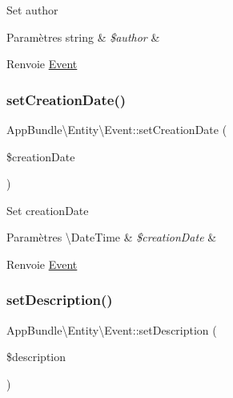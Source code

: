 Set author


\begin{DoxyParams}[1]{Paramètres}
string & {\em \$author} & \\
\hline
\end{DoxyParams}
\begin{DoxyReturn}{Renvoie}
\hyperlink{classAppBundle_1_1Entity_1_1Event}{Event} 
\end{DoxyReturn}
\mbox{\label{classAppBundle_1_1Entity_1_1Event_a20b1f3bfc2c142e2b807384631101d06}} 
\subsubsection{\texorpdfstring{set\+Creation\+Date()}{setCreationDate()}}
{\footnotesize\ttfamily App\+Bundle\textbackslash{}\+Entity\textbackslash{}\+Event\+::set\+Creation\+Date (\begin{DoxyParamCaption}\item[{}]{\$creation\+Date }\end{DoxyParamCaption})}

Set creation\+Date


\begin{DoxyParams}[1]{Paramètres}
\textbackslash{}\+Date\+Time & {\em \$creation\+Date} & \\
\hline
\end{DoxyParams}
\begin{DoxyReturn}{Renvoie}
\hyperlink{classAppBundle_1_1Entity_1_1Event}{Event} 
\end{DoxyReturn}
\mbox{\label{classAppBundle_1_1Entity_1_1Event_ab97fe1479bede8949391c7ade9112406}} 
\subsubsection{\texorpdfstring{set\+Description()}{setDescription()}}
{\footnotesize\ttfamily App\+Bundle\textbackslash{}\+Entity\textbackslash{}\+Event\+::set\+Description (\begin{DoxyParamCaption}\item[{}]{\$description }\end{DoxyParamCaption})}

